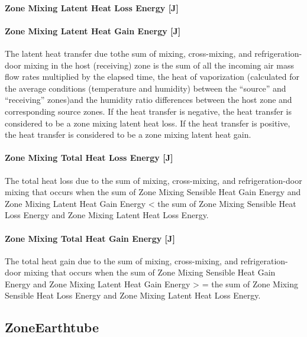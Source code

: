 \paragraph{Zone Mixing Latent Heat Loss Energy {[}J{]}}\label{zone-mixing-latent-heat-loss-energy-j-2}

\paragraph{Zone Mixing Latent Heat Gain Energy {[}J{]}}\label{zone-mixing-latent-heat-gain-energy-j-2}

The latent heat transfer due tothe sum of mixing, cross-mixing, and refrigeration-door mixing in the host (receiving) zone is the sum of all the incoming air mass flow rates multiplied by the elapsed time, the heat of vaporization (calculated for the average conditions (temperature and humidity) between the ``source'' and ``receiving'' zones)and the humidity ratio differences between the host zone and corresponding source zones. If the heat transfer is negative, the heat transfer is considered to be a zone mixing latent heat loss. If the heat transfer is positive, the heat transfer is considered to be a zone mixing latent heat gain.

\paragraph{Zone Mixing Total Heat Loss Energy {[}J{]}}\label{zone-mixing-total-heat-loss-energy-j-2}

The total heat loss due to the sum of mixing, cross-mixing, and refrigeration-door mixing that occurs when the sum of Zone Mixing Sensible Heat Gain Energy and Zone Mixing Latent Heat Gain Energy \textless{} the sum of Zone Mixing Sensible Heat Loss Energy and Zone Mixing Latent Heat Loss Energy.

\paragraph{Zone Mixing Total Heat Gain Energy {[}J{]}}\label{zone-mixing-total-heat-gain-energy-j-2}

The total heat gain due to the sum of mixing, cross-mixing, and refrigeration-door mixing that occurs when the sum of Zone Mixing Sensible Heat Gain Energy and Zone Mixing Latent Heat Gain Energy \textgreater{} = the sum of Zone Mixing Sensible Heat Loss Energy and Zone Mixing Latent Heat Loss Energy.

\subsection{ZoneEarthtube}\label{zoneearthtube-earth-tube}

